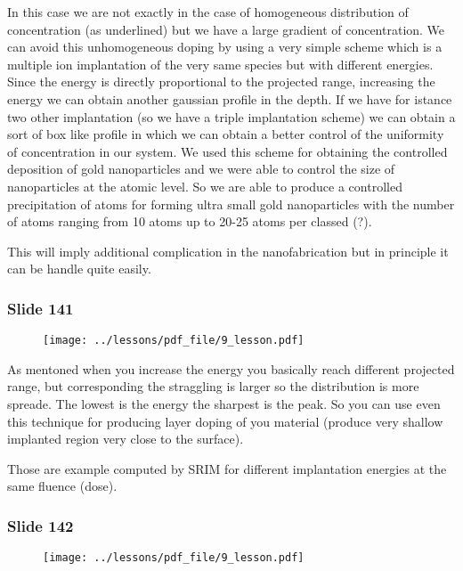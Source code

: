 \documentclass[../main/main.tex]{subfiles}
\begin{document}
In this case we are not exactly in the case of homogeneous distribution of concentration (as underlined) but we have a large gradient of concentration. We can avoid this unhomogeneous doping by using a very simple scheme which is a multiple ion implantation of the very same species but with different energies. Since the energy is directly proportional to the projected range, increasing the energy we can obtain another gaussian profile in the depth.  If we have for istance two other implantation (so we have a triple implantation scheme) we can obtain a sort of box like profile in which we can obtain a better control of the uniformity of concentration in our system. We used this scheme for obtaining the controlled deposition of gold nanoparticles and we were able to control the size of nanoparticles at the atomic level. So we are able to produce a controlled precipitation of atoms for forming ultra small gold nanoparticles with the number of atoms ranging from 10 atoms up to 20-25 atoms per classed (?).

This will imply additional complication in the nanofabrication but in principle it can be handle quite easily.

\newpage

\subsubsection{Slide 141}

\begin{figure}[h!]
\centering
\texttt{[image: ../lessons/pdf\_file/9\_lesson.pdf]}
\end{figure}

As mentoned when you increase the energy you basically reach different projected range, but corresponding the straggling is larger so the distribution is more spreade. The lowest is the energy the sharpest is the peak. So you can use even this technique for producing layer doping of you material (produce very shallow implanted region very close to the surface).

Those are example computed by SRIM for different implantation energies at the same fluence (dose).

\newpage

\subsubsection{Slide 142}

\begin{figure}[h!]
\centering
\texttt{[image: ../lessons/pdf\_file/9\_lesson.pdf]}
\end{figure}
\end{document}
